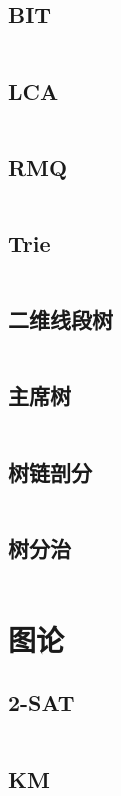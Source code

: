 \documentclass[titlepage,landscape,a4paper,10pt]{article}
\begin{document}
\begin{multicols}{2}
\begin{spacing}{0.8}
\subsection{BIT}
\inputminted{cpp}{DataStructure/BIT.cpp}

\subsection{LCA}
\inputminted{cpp}{DataStructure/LCA.cpp}

\subsection{RMQ}
\inputminted{cpp}{DataStructure/RMQ.cpp}

\subsection{Trie}
\inputminted{cpp}{DataStructure/trie.cpp}

\subsection{二维线段树}
\inputminted{cpp}{DataStructure/二维线段树.cpp}

\subsection{主席树}
\inputminted{cpp}{DataStructure/主席树.cpp}

\subsection{树链剖分}
\inputminted{cpp}{DataStructure/树链剖分.cpp}

\subsection{树分治}
\inputminted{cpp}{DataStructure/树分治.cpp}

\section{图论}

\subsection{2-SAT}
\inputminted{cpp}{Graph/2-SAT.cpp}

\subsection{KM}
\inputminted{cpp}{Graph/KM.cpp}


\end{spacing}
\end{multicols}
\end{document}
